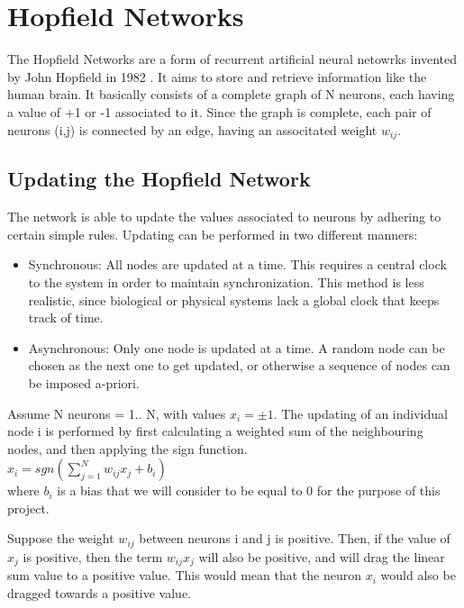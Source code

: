 \section{Hopfield Networks}
The Hopfield Networks are a form of recurrent artificial neural netowrks invented by John Hopfield in 1982 \cite{hopfield_wiki}. It aims to store and retrieve information like the human brain. It basically consists of a complete graph of N neurons, each having a value of +1 or -1 associated to it. Since the graph is complete, each pair of neurons (i,j) is connected by an edge, having an associtated weight \( w_{ij}\). 

\subsection{Updating the Hopfield Network}

The network is able to update the values associated to neurons by adhering to certain simple rules. Updating can be performed in two different manners:
\begin{itemize}
 \item Synchronous: All nodes are updated at a time. This requires a central clock to the system in order to maintain synchronization. This method is less realistic, since biological or physical systems lack a global clock that keeps track of time. 
 \item Asynchronous: Only one node is updated at a time. A random node can be chosen as the next one to get updated, or otherwise a sequence of nodes can be imposed a-priori.
\end{itemize}

Assume N neurons = 1.. N, with values \(x_{i} = \pm1\). The updating of an individual node i is performed by first calculating a weighted sum of the neighbouring nodes, and then applying the sign function. \\

\begin{math}
 x_{i} = sgn(\sum_{j=1}^{N}w_{ij}x_{j} + b_{i})
\end{math}\\

where \( b_{i} \) is a bias that we will consider to be equal to 0 for the purpose of this project.

Suppose the weight \( w_{ij}\) between neurons i and j is positive. Then, if the value of \( x_{j} \) is positive, then the term \( w_{ij}x_{j} \) will also be positive, and will drag the linear sum value to a positive value. This would mean that the neuron \( x_{i} \) would also be dragged towards a positive value. 

